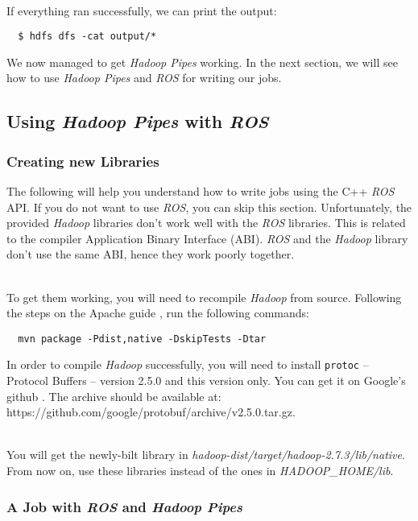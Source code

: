 \documentclass[a4paper, 12pt]{article}
\begin{document}
~\\
If everything ran successfully, we can print the output:

\begin{verbatim}
  $ hdfs dfs -cat output/*
\end{verbatim}
  
We now managed to get \textit{Hadoop Pipes} working. In the next section, we will see how to use \textit{Hadoop Pipes} and \textit{ROS} for writing our jobs.

  \subsection{Using \textit{Hadoop Pipes} with \textit{ROS}}

    \subsubsection{Creating new Libraries}

The following will help you understand how to write jobs using the C++ \textit{ROS} API. If you do not want to use \textit{ROS}, you can skip this section. Unfortunately, the provided \textit{Hadoop} libraries don't work well with the \textit{ROS} libraries. This is related to the compiler Application Binary Interface (ABI). \textit{ROS} and the \textit{Hadoop} library don't use the same ABI, hence they work poorly together. 

~\\
To get them working, you will need to recompile \textit{Hadoop} from source. Following the steps on the Apache guide \cite{native_libs}, run the following commands:

\begin{verbatim}
  mvn package -Pdist,native -DskipTests -Dtar
\end{verbatim}

In order to compile \textit{Hadoop} successfully, you will need to install \texttt{protoc} -- Protocol Buffers -- version 2.5.0 and this version only. You can get it on Google's github \cite{google_github}. The archive should be available at: https://github.com/google/protobuf/archive/v2.5.0.tar.gz.

~\\
You will get the newly-bilt library in \textit{hadoop-dist/target/hadoop-2.7.3/lib/native}. From now on, use these libraries instead of the ones in \textit{HADOOP\_HOME/lib}.

    \subsubsection{A Job with \textit{ROS} and \textit{Hadoop Pipes}}
  
\end{document}

